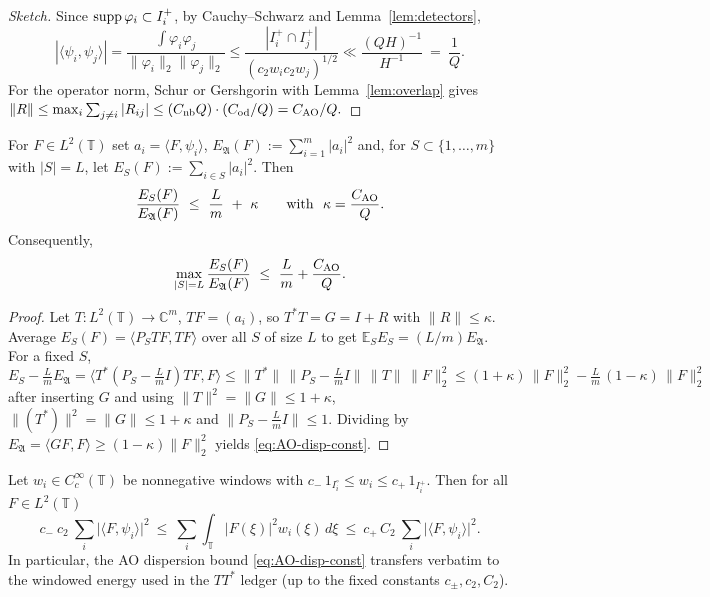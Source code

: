 \begin{proof}[Sketch]
Since $\operatorname{supp}\varphi_i\subset I_i^+$, by Cauchy–Schwarz and Lemma~\ref{lem:detectors},
\[
|\langle\psi_i,\psi_j\rangle|
=\frac{\int \varphi_i\varphi_j}{\|\varphi_i\|_2\|\varphi_j\|_2}
\le \frac{|I_i^+\cap I_j^+|}{(c_2 w_i c_2 w_j)^{1/2}}
\ll \frac{(QH)^{-1}}{H^{-1}}\ =\ \frac{1}{Q}.
\]
For the operator norm, Schur or Gershgorin with Lemma~\ref{lem:overlap} gives
\(
\|R\|\le \max_i \sum_{j\ne i}|R_{ij}|
\le (C_{\rm nb}Q)\cdot (C_{\rm od}/Q)= C_{\rm AO}/Q.
\)
\end{proof}

\begin{theorem}\label{thm:AO-disp-full}
For $F\in L^2(\mathbb T)$ set $a_i=\langle F,\psi_i\rangle$, $E_{\mathfrak A}(F):=\sum_{i=1}^m |a_i|^2$ and, for $S\subset\{1,\dots,m\}$ with $|S|=L$, let $E_S(F):=\sum_{i\in S}|a_i|^2$.
Then
\begin{equation}\label{eq:AO-disp-const}
\frac{E_S(F)}{E_{\mathfrak A}(F)}\ \le\ \frac{L}{m}\ +\ \kappa
\qquad\text{with }\ \kappa=\frac{C_{\rm AO}}{Q}.
\end{equation}
Consequently,
\[
\max_{|S|=L}\frac{E_S(F)}{E_{\mathfrak A}(F)}\ \le\ \frac{L}{m}+\frac{C_{\rm AO}}{Q}.
\]
\end{theorem}

\begin{proof}
Let $T:L^2(\mathbb T)\to\mathbb C^m$, $TF=(a_i)$, so $T^\ast T=G=I+R$ with $\|R\|\le\kappa$.
Average $E_S(F)=\langle P_S TF,TF\rangle$ over all $S$ of size $L$ to get $\mathbb E_S E_S=(L/m)E_{\mathfrak A}$.
For a fixed $S$,
\[
E_S-\tfrac{L}{m}E_{\mathfrak A}
=\langle T^\ast(P_S-\tfrac{L}{m}I)T F,F\rangle
\le \|T^\ast\|\,\|P_S-\tfrac{L}{m}I\|\,\|T\|\,\|F\|_2^2
\le (1+\kappa)\,\|F\|_2^2 - \tfrac{L}{m}\,(1-\kappa)\,\|F\|_2^2
\]
after inserting $G$ and using $\|T\|^2=\|G\|\le 1+\kappa$, $\|(T^\ast)\|^2=\|G\|\le 1+\kappa$ and $\|P_S-\tfrac{L}{m}I\|\le 1$.
Dividing by $E_{\mathfrak A}=\langle GF,F\rangle \ge (1-\kappa)\|F\|_2^2$ yields \eqref{eq:AO-disp-const}.
\end{proof}

\begin{proposition}\label{prop:AO-eq-window}
Let $w_i\in C_c^\infty(\mathbb T)$ be nonnegative windows with $c_-\,1_{I_i^\circ}\le w_i\le c_+\,1_{I_i^+}$.
Then for all $F\in L^2(\mathbb T)$
\[
c_-\ c_2\ \sum_{i} \big|\langle F,\psi_i\rangle\big|^2
\ \le\ 
\sum_i \int_{\mathbb T} |F(\xi)|^2 w_i(\xi)\,d\xi
\ \le\ 
c_+\, C_2\ \sum_{i} \big|\langle F,\psi_i\rangle\big|^2.
\]
In particular, the AO dispersion bound \eqref{eq:AO-disp-const} transfers verbatim to the windowed energy used in the $TT^\ast$ ledger (up to the fixed constants $c_\pm, c_2, C_2$).
\end{proposition}

